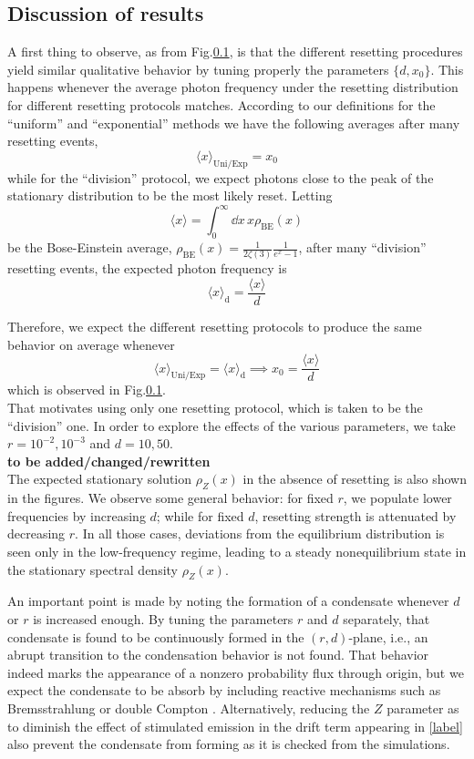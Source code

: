 \documentclass[a4paper,12pt,reqno,superscriptaddress,nofootinbib]{article}
\theoremstyle{plain}
\theoremstyle{definition}
\theoremstyle{remark}
\newcommand{\0}{^{(0)}}
\newcommand{\1}{^{(1)}}
\newcommand{\2}{^{(2)}}
\begin{document}
\subsection{Discussion of results}

A first thing to observe, as from Fig.\ref{}, is that the different resetting procedures yield similar qualitative behavior by tuning properly the parameters $\{d,x_0\}$.  This happens whenever the average photon frequency under the resetting distribution for different resetting protocols matches. According to our definitions for the ``uniform'' and ``exponential'' methods we have the following averages after many resetting events,
\[\langle x \rangle_{\text{Uni/Exp}} = x_0\]
while for the ``division'' protocol, we expect photons close to the peak of the stationary distribution to be the most likely reset. Letting
\[\langle x \rangle = \int_0^{\infty}\dd x\,  x\rho_\text{BE}(x)\]
be the Bose-Einstein average, $\rho_\text{BE}(x) = \frac{1}{2\zeta(3)}\frac{1}{e^{x}-1}$,  after many ``division'' resetting events, the expected photon frequency is
\[\langle x\rangle_{\text{d}}=\frac{\langle x \rangle}{d} \]

Therefore, we expect the different resetting protocols to produce the same behavior on average whenever
\[\langle x \rangle_{\text{Uni/Exp}}=\langle x\rangle_{\text{d}} \implies x_0=\frac{\langle x \rangle}{d}\]
which is observed in Fig.\ref{}.\\
That motivates  using only one resetting protocol, which is taken to be the ``division'' one. In order to explore the effects of the various parameters, we take $r=10^{-2},10^{-3}$ and $d=10,50$.\\  

\textbf{to be added/changed/rewritten}\\

 The expected stationary solution $\rho_Z(x)$ in the absence of resetting is also shown in the figures. We observe some general behavior: for fixed $r$, we populate lower frequencies by increasing $d$; while for fixed $d$, resetting strength is attenuated by decreasing $r$. In all those cases, deviations from the equilibrium distribution is seen only in the low-frequency regime, leading to a steady nonequilibrium state in the stationary spectral density $\rho_Z(x)$.

An important point is made by noting the formation of a condensate whenever $d$ or $r$ is increased enough. By tuning the parameters $r$ and $d$ separately, that condensate is found to be continuously formed in the $(r,d)$-plane, i.e., an abrupt transition to the condensation behavior is not found. That behavior indeed marks the appearance of a nonzero probability flux through origin, but we expect the condensate to be absorb by including reactive mechanisms such as Bremsstrahlung or double Compton \cite{paper2}. Alternatively, reducing the $Z$ parameter as to diminish the effect of stimulated emission in the drift term appearing in \eqref{label} also prevent the condensate from forming as it is checked from the simulations.
\end{document}
